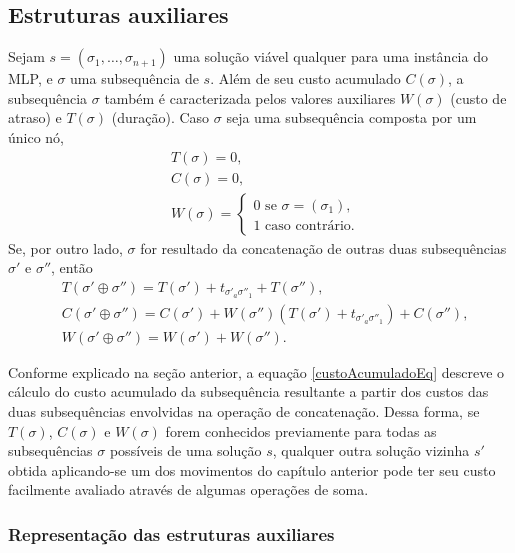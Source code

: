 \subsection{Estruturas auxiliares}

Sejam $s = (\sigma_1, \dots, \sigma_{n+1})$ uma solução viável qualquer para uma instância do MLP, e $\sigma$ uma subsequência de $s$. Além de seu custo acumulado $C(\sigma)$, a subsequência $\sigma$ também é caracterizada pelos valores auxiliares $W(\sigma)$ (custo de atraso) e $T(\sigma)$ (duração). Caso $\sigma$ seja uma subsequência composta por um único nó, 
\begin{align}
    &T(\sigma) = 0, \label{duracaoEqSimples} \\
    &C(\sigma) = 0, \label{custoAcumuladoEqSimples} \\
    &W(\sigma) = \begin{cases} 0 \text{ se } \sigma = (\sigma_1), \\ 1 \text{ caso contrário.} \end{cases} \label{custoDeAtrasoEqSimples}
\end{align}
Se, por outro lado, $\sigma$ for resultado da concatenação de outras duas subsequências $\sigma'$ e $\sigma''$, então 
\begin{align}
    &T(\sigma' \oplus \sigma'') = T(\sigma') + t_{{\sigma'_a}{\sigma''_1}} +  T(\sigma''),  \label{duracaoEq} \\
    &C(\sigma' \oplus \sigma'') = C(\sigma') + W(\sigma'')\left( T(\sigma') + t_{{\sigma'_a}{\sigma''_1}} \right) +  C(\sigma''), \label{custoAcumuladoEq}\\
    &W(\sigma' \oplus \sigma'') = W(\sigma') + W(\sigma'') \label{custoDeAtrasoEq}.
\end{align}

Conforme explicado na seção anterior, a equação \eqref{custoAcumuladoEq} descreve o cálculo do custo acumulado da subsequência resultante a partir dos custos das duas subsequências envolvidas na operação de concatenação. Dessa forma, se $T(\sigma)$, $C(\sigma)$ e $W(\sigma)$ forem conhecidos previamente para todas as subsequências $\sigma$ possíveis de uma solução $s$, qualquer outra solução vizinha $s'$ obtida aplicando-se um dos movimentos do capítulo anterior pode ter seu custo facilmente avaliado através de algumas operações de soma. 

\subsubsection{Representação das estruturas auxiliares}

